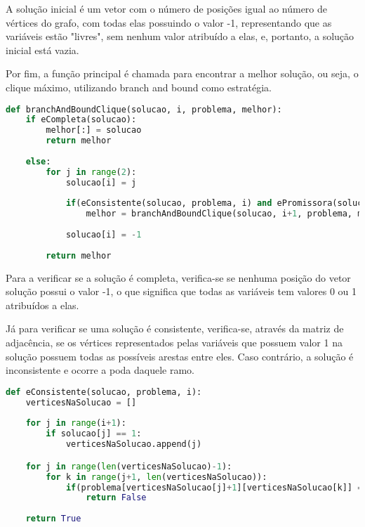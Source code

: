 \documentclass[12pt]{article}
\begin{document}
    \par A solução inicial é um vetor com o número de posições igual ao número de vértices do grafo, com todas elas possuindo o valor -1, representando que as variáveis estão "livres", sem nenhum valor atribuído a elas, e, portanto, a solução inicial está vazia.

    \par Por fim, a função principal é chamada para encontrar a melhor solução, ou seja, o clique máximo, utilizando branch and bound como estratégia.
\begin{lstlisting}[caption={Função que encontra o clique máximo através de branch and bound},label={lst:codClique2},language=Python]
def branchAndBoundClique(solucao, i, problema, melhor):
    if eCompleta(solucao):
        melhor[:] = solucao
        return melhor
    
    else:
        for j in range(2):
            solucao[i] = j
            
            if(eConsistente(solucao, problema, i) and ePromissora(solucao, problema, melhor, i)):
                melhor = branchAndBoundClique(solucao, i+1, problema, melhor)
            
            solucao[i] = -1
        
        return melhor
 \end{lstlisting}

     \par Para a verificar se a solução é completa, verifica-se se nenhuma posição do vetor solução possui o valor -1, o que significa que todas as variáveis tem valores 0 ou 1 atribuídos a elas.

     \par Já para verificar se uma solução é consistente, verifica-se, através da matriz de adjacência, se os vértices representados pelas variáveis que possuem valor 1 na solução possuem todas as possíveis arestas entre eles. Caso contrário, a solução é inconsistente e ocorre a poda daquele ramo.
\begin{lstlisting}[caption={Função que verifica a consistência da solução até o momento},label={lst:codClique3},language=Python]
def eConsistente(solucao, problema, i):
    verticesNaSolucao = []
    
    for j in range(i+1):
        if solucao[j] == 1:
            verticesNaSolucao.append(j)

    for j in range(len(verticesNaSolucao)-1):
        for k in range(j+1, len(verticesNaSolucao)):
            if(problema[verticesNaSolucao[j]+1][verticesNaSolucao[k]] == 0):
                return False
            
    return True 
 \end{lstlisting}
\end{document}
